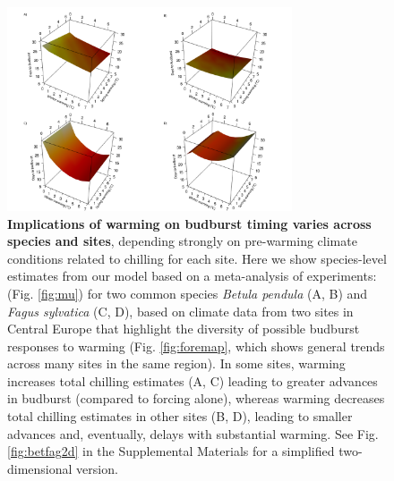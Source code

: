 \documentclass{article}
\newcommand{\R}[1]{\label{#1}\linelabel{#1}}
\begin{document}
\begin{figure}[h!]
\centering
\noindent \includegraphics[width=0.75\textwidth]{..//..//analyses/bb_analysis/figures/forecasting/tempforecastbothspp_1_7_degwarm3D_utah.png}
\caption{\textbf{Implications of warming on budburst timing varies across species and sites}, depending strongly on pre-warming climate conditions related to chilling for each site. Here we show species-level estimates from our model based on a meta-analysis of experiments\R{ee14}:(Fig. \ref{fig:mu}) for two common species \emph{Betula pendula} (A, B) and \emph{Fagus sylvatica} (C, D), based on climate data from two sites in Central Europe that highlight the diversity of possible budburst responses to warming (Fig. \ref{fig:foremap}, which shows general trends across many sites in the same region). In some sites, warming increases total chilling estimates (A, C) leading to greater advances in budburst (compared to forcing alone), whereas warming decreases total chilling estimates in other sites (B, D), leading to smaller advances and, eventually, delays with substantial warming. See Fig. \ref{fig:betfag2d} in the Supplemental Materials for a simplified two-dimensional version.}
\label{fig:betfag3d}
\end{figure}

\end{document}
